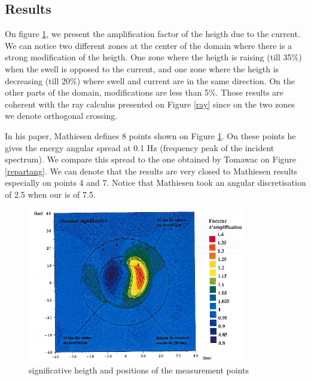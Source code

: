 \subsection{Results}
%
On figure \ref{measurepts}, we present the amplification factor of the heigth
due to the current. We can notice two different zones at the center of the
domain where there is a strong modification of the heigth. One zone where the
heigth is raising (till 35\%) when the swell is opposed to the current, and one
zone where the heigth is decreasing (till 20\%) where swell and current are in
the same direction. On the other parts of the domain, modifications are less than
5\%. Those results are coherent with the ray calculus presented on Figure
\ref{ray} since on the two zones we denote orthogonal crossing.

In his paper, Mathiesen \cite{Mathiesen1987} defines 8 points shown on
Figure \ref{measurepts}. On these points he gives the energy angular spread at
0.1 Hz (frequency peak of the incident spectrum). We compare this spread to the
one obtained by Tomawac on Figure \ref{repartang}. We can denote that the
results are very closed to Mathiesen results especially on points 4 and 7.
Notice that Mathiesen took an angular discretisation of 2.5 when our is of 7.5.

\begin{figure} [!h]
\centering
\includegraphics[width=0.85\textwidth]{whirlcurrentpoints.png}
 \caption{significative heigth and positions of the measurement points}
\label{measurepts}
\end{figure}


